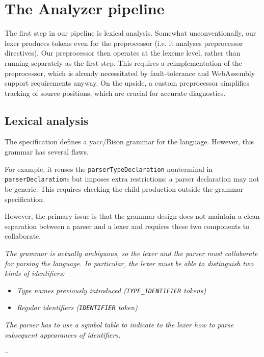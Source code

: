 \section{The  Analyzer pipeline}

The first step in our pipeline is lexical analysis. Somewhat unconventionally,
our lexer produces tokens even for the preprocessor (i.e. it analyses
preprocessor directives). Our preprocessor then operates at the lexeme level,
rather than running separately as the first step. This requires a
reimplementation of the preprocessor, which is already necessitated by
fault-tolerance and WebAssembly support requirements anyway. On the upside, a
custom preprocessor simplifies tracking of source positions, which are crucial
for accurate diagnostics.

\subsection{Lexical analysis}

The \pfs specification defines a \acrshort{yacc}/Bison grammar for the language.
However, this grammar has several flaws.

For example, it reuses the \texttt{parserTypeDeclaration} non\-terminal in
\texttt{parserDeclaration}s but imposes extra restrictions: a parser declaration
may not be generic. This requires checking the child production outside the
grammar specification.

However, the primary issue is that the grammar design does not maintain a clean
separation between a parser and a lexer and requires these two components to
collaborate.

\begin{displayquote}
	\textit{The grammar is actually ambiguous, so the lexer and the parser must
	collaborate for parsing the language. In particular, the lexer must be able
	to distinguish two kinds of identifiers:}

	\begin{itemize}
		\item \textit{Type names previously introduced (\texttt{TYPE\_IDENTIFIER}
		tokens)}
		\item \textit{Regular identifiers (\texttt{IDENTIFIER} token)}
	\end{itemize}

	\textit{The parser has to use a symbol table to indicate to the lexer how to
	parse subsequent appearances of identifiers.}

	--  \cite{p416:v123:spec}
\end{displayquote}

